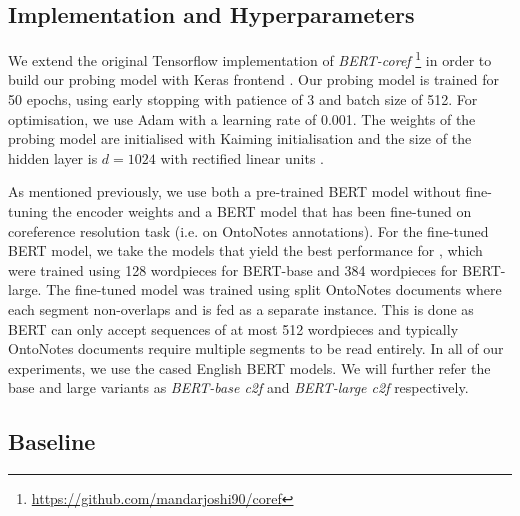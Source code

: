 \documentclass[11pt]{article}
\begin{document}
\subsection{Implementation and Hyperparameters} 

We extend the original Tensorflow implementation of \textit{BERT-coref} \footnote{\url{https://github.com/mandarjoshi90/coref}} in order to build our probing model with Keras frontend \parencite{chollet2015keras}. Our probing model is trained for 50 epochs, using early stopping with patience of 3 and batch size of 512. For optimisation, we use Adam \parencite{adam} with a learning rate of 0.001. The weights of the probing model are initialised with Kaiming initialisation \parencite{kaiming} and the size of the hidden layer is $d=1024$ with rectified linear units \parencite{relu}.

As mentioned previously, we use both a pre-trained BERT model without fine-tuning the encoder weights and a BERT model that has been fine-tuned on coreference resolution task (i.e. on OntoNotes annotations). For the fine-tuned BERT model, we take the models that yield the best performance for \textcite{joshi2019coref}, which were trained using 128 wordpieces for BERT-base and 384 wordpieces for BERT-large. The fine-tuned model was trained using split OntoNotes documents where each segment non-overlaps and is fed as a separate instance. This is done as BERT can only accept sequences of at most 512 wordpieces and typically OntoNotes documents require multiple segments to be read entirely. In all of our experiments, we use the cased English BERT models. We will further refer the base and large variants as \textit{BERT-base c2f} and \textit{BERT-large c2f} respectively.

\subsection{Baseline}
\end{document}
